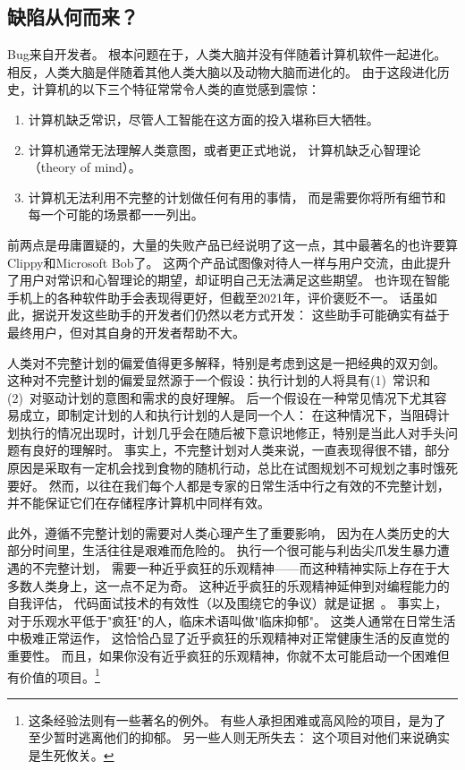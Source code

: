 \subsection{缺陷从何而来？}
\label{sec:debugging:Where Do Bugs Come From?}

Bug来自开发者。
根本问题在于，人类大脑并没有伴随着计算机软件一起进化。
相反，人类大脑是伴随着其他人类大脑以及动物大脑而进化的。
由于这段进化历史，计算机的以下三个特征常常令人类的直觉感到震惊：

\begin{enumerate}
\item	计算机缺乏常识，尽管人工智能在这方面的投入堪称巨大牺牲。
\item	计算机通常无法理解人类意图，或者更正式地说，
	计算机缺乏心智理论（theory of mind）。
\item	计算机无法利用不完整的计划做任何有用的事情，
	而是需要你将所有细节和每一个可能的场景都一一列出。
\end{enumerate}

前两点是毋庸置疑的，大量的失败产品已经说明了这一点，其中最著名的也许要算Clippy和Microsoft Bob了。
这两个产品试图像对待人一样与用户交流，由此提升了用户对常识和心智理论的期望，却证明自己无法满足这些期望。
也许现在智能手机上的各种软件助手会表现得更好，但截至2021年，评价褒贬不一。
话虽如此，据说开发这些助手的开发者们仍然以老方式开发：
这些助手可能确实有益于最终用户，但对其自身的开发者帮助不大。

人类对不完整计划的偏爱值得更多解释，特别是考虑到这是一把经典的双刃剑。
这种对不完整计划的偏爱显然源于一个假设：执行计划的人将具有(1)~常识和(2)~对驱动计划的意图和需求的良好理解。
后一个假设在一种常见情况下尤其容易成立，即制定计划的人和执行计划的人是同一个人：
在这种情况下，当阻碍计划执行的情况出现时，计划几乎会在随后被下意识地修正，特别是当此人对手头问题有良好的理解时。
事实上，不完整计划对人类来说，一直表现得很不错，部分原因是采取有一定机会找到食物的随机行动，总比在试图规划不可规划之事时饿死要好。
然而，以往在我们每个人都是专家的日常生活中行之有效的不完整计划，并不能保证它们在存储程序计算机中同样有效。

此外，遵循不完整计划的需要对人类心理产生了重要影响，
因为在人类历史的大部分时间里，生活往往是艰难而危险的。
执行一个很可能与利齿尖爪发生暴力遭遇的不完整计划，
需要一种近乎疯狂的乐观精神——而这种精神实际上存在于大多数人类身上，这一点不足为奇。
这种近乎疯狂的乐观精神延伸到对编程能力的自我评估，
代码面试技术的有效性（以及围绕它的争议）就是证据~\cite{RegBraithwaite2007FizzBuzz}。
事实上，对于乐观水平低于"疯狂"的人，临床术语叫做"临床抑郁"。
这类人通常在日常生活中极难正常运作，
这恰恰凸显了近乎疯狂的乐观精神对正常健康生活的反直觉的重要性。
而且，如果你没有近乎疯狂的乐观精神，你就不太可能启动一个困难但有价值的项目。\footnote{
	这条经验法则有一些著名的例外。
	有些人承担困难或高风险的项目，是为了
	至少暂时逃离他们的抑郁。
	另一些人则无所失去：
	这个项目对他们来说确实是生死攸关。}


